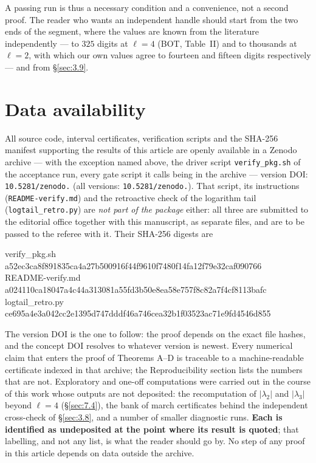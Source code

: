 \noindent A passing run is thus a necessary condition and a convenience, not a
second proof. The reader who wants an independent handle should start from the
two ends of the segment, where the values are known from the literature
independently --- to $325$ digits at $\ell = 4$ (BOT, Table~II) and to
thousands at $\ell = 2$, with which our own values agree to fourteen and
fifteen digits respectively --- and from \S\ref{sec:3.9}.

\section*{Data availability}

All source code, interval certificates, verification scripts and the SHA-256
manifest supporting the results of this article are openly available in a Zenodo
archive --- with the exception named above, the driver script
\texttt{verify\_\allowbreak pkg.sh} of the acceptance run, every gate script it calls being
in the archive --- version DOI: \texttt{10.5281/\allowbreak zenodo.} (all versions: \texttt{10.5281/\allowbreak zenodo.}).
That script, its instructions
(\texttt{README-verify.md}) and the retroactive check of the logarithm tail
(\texttt{logtail\_\allowbreak retro.py}) are \emph{not part of the package}
either: all three are
submitted to the editorial office together with
this manuscript, as separate files, and are to be passed to the referee with
it. Their SHA-256 digests are
\begin{flushleft}\footnotesize\ttfamily
verify\_pkg.sh\\
a52ec3ca8f891835ca4a27b500916f44f9610f7480f14fa12f79e32caf090766\\[2pt]
README-verify.md\\
a024110ca18047a4c44a313081a55fd3b50e8ea58e757f8c82a7f4cf8113bafc\\[2pt]
logtail\_retro.py\\
ce695a4e3a042cc2e1395d747dddf46a746cea32b1f03523ac71e9fd4546d855
\end{flushleft}
\noindent The version DOI is the one to follow: the proof depends on the exact file hashes, and the concept DOI resolves to whatever version is newest. Every numerical claim that enters the proof of
Theorems A--D is traceable to a machine-readable certificate indexed in that
archive; the Reproducibility section lists the numbers that are not.
Exploratory and one-off computations were carried out in the course of this
work whose outputs are not deposited: the recomputation of $|\lambda_{2}|$ and
$|\lambda_{3}|$ beyond $\ell = 4$ (\S\ref{sec:7.4}), the bank of march
certificates behind the independent cross-check of \S\ref{sec:3.8}, and a
number of smaller diagnostic runs. \textbf{Each is identified as undeposited at
the point where its result is quoted}; that labelling, and not any list, is
what the reader should go by. No step of any proof in this article depends on
data outside the archive.

